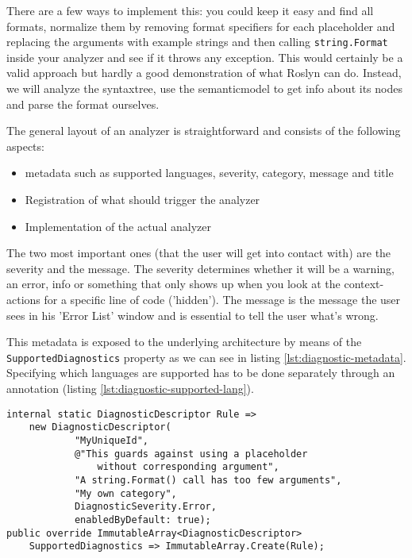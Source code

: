 There are a few ways to implement this: you could keep it easy and find all formats, normalize them by removing format specifiers for each placeholder and replacing the arguments with example strings and then calling \texttt{string.Format} inside your analyzer and see if it throws any exception. This would certainly be a valid approach but hardly a good demonstration of what Roslyn can do. Instead, we will analyze the \gls{syntaxtree}, use the \gls{semanticmodel} to get info about its nodes and parse the format ourselves.

The general layout of an analyzer is straightforward and consists of the following aspects:

\begin{itemize}
\item \Gls{metadata} such as supported languages, severity, category, message and title
\item Registration of what should trigger the analyzer
\item Implementation of the actual analyzer
\end{itemize}

The two most important ones (that the user will get into contact with) are the severity and the message. The severity determines whether it will be a warning, an error, info or something that only shows up when you look at the context-actions for a specific line of code ('hidden'). The message is the message the user sees in his 'Error List' window and is essential to tell the user what's wrong.

This \gls{metadata} is exposed to the underlying architecture by means of the \texttt{SupportedDiagnostics} property as we can see in listing \ref{lst:diagnostic-metadata}. Specifying which languages are supported has to be done separately through an annotation (listing \ref{lst:diagnostic-supported-lang}).

\begin{lstlisting}[label={lst:diagnostic-metadata}]
internal static DiagnosticDescriptor Rule =>
	new DiagnosticDescriptor(
			"MyUniqueId", 
			@"This guards against using a placeholder 
				without corresponding argument", 
			"A string.Format() call has too few arguments", 
			"My own category", 
			DiagnosticSeverity.Error, 
			enabledByDefault: true);
public override ImmutableArray<DiagnosticDescriptor> 
	SupportedDiagnostics => ImmutableArray.Create(Rule);							
\end{lstlisting}

